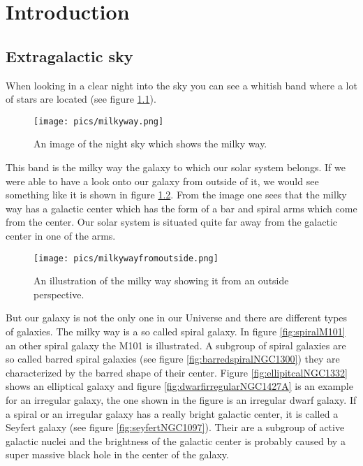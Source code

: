 \chapter{Introduction}

\section{Extragalactic sky}
When looking in a clear night into the sky you can see a whitish band where a lot of stars are located (see figure \ref{fig:milkyway}). 
\begin{figure}[H]
	\centering
		\texttt{[image: pics/milkyway.png]}
		\caption{An image of the night sky which shows the milky way.}
		\label{fig:milkyway}
\end{figure}
This band is the milky way the galaxy to which our solar system belongs. If we were able to have a look onto our galaxy from outside of it, we would see something like it is shown in figure \ref{fig:milkywayoutside}. From the image one sees that the milky way has a galactic center which has the form of a bar and spiral arms which come from the center. Our solar system is situated quite far away from the galactic center in one of the arms. 
\begin{figure}[H]
	\centering
		\texttt{[image: pics/milkywayfromoutside.png]}
		\caption{An illustration of the milky way showing it from an outside perspective.}
		\label{fig:milkywayoutside}
\end{figure}
But our galaxy is not the only one in our Universe and there are different types of galaxies. The milky way is a so called spiral galaxy. In figure \ref{fig:spiralM101} an other spiral galaxy the M101 is illustrated. A subgroup of spiral galaxies are so called barred spiral galaxies (see figure \ref{fig:barredspiralNGC1300}) they are characterized by the barred shape of their center. Figure \ref{fig:ellipitcalNGC1332} shows an elliptical galaxy and figure \ref{fig:dwarfirregularNGC1427A} is an example for an irregular galaxy, the one shown in the figure is an irregular dwarf galaxy. If a spiral or an irregular galaxy has a really bright galactic center, it is called a Seyfert galaxy (see figure \ref{fig:seyfertNGC1097}). Their are a subgroup of active galactic nuclei and the brightness of the galactic center is probably caused by a super massive black hole in the center of the galaxy. 
